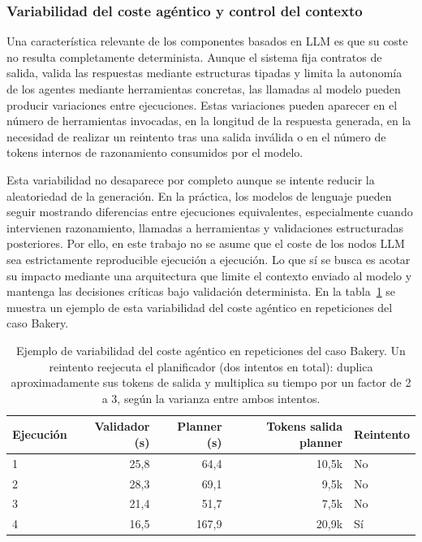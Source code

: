 \documentclass[12pt,a4paper]{article}
\theoremstyle{plain}
\begin{document}
\subsubsection{Variabilidad del coste agéntico y control del contexto}
\label{sec:coste-variabilidad}

Una característica relevante de los componentes basados en LLM es que su coste no resulta
completamente determinista. Aunque el sistema fija contratos de salida, valida las respuestas
mediante estructuras tipadas y limita la autonomía de los agentes mediante herramientas
concretas, las llamadas al modelo pueden producir variaciones entre ejecuciones. Estas
variaciones pueden aparecer en el número de herramientas invocadas, en la longitud de la
respuesta generada, en la necesidad de realizar un reintento tras una salida inválida o en el
número de tokens internos de razonamiento consumidos por el modelo.

Esta variabilidad no desaparece por completo aunque se intente reducir la aleatoriedad de la
generación. En la práctica, los modelos de lenguaje pueden seguir mostrando diferencias entre
ejecuciones equivalentes, especialmente cuando intervienen razonamiento, llamadas a
herramientas y validaciones estructuradas posteriores. Por ello, en este trabajo no se asume
que el coste de los nodos LLM sea estrictamente reproducible ejecución a ejecución. Lo que sí
se busca es acotar su impacto mediante una arquitectura que limite el contexto enviado al
modelo y mantenga las decisiones críticas bajo validación determinista. En la tabla~\ref{tab:variabilidad-coste-agente} se muestra un ejemplo de esta variabilidad del coste agéntico en repeticiones del caso Bakery. %

\begin{table}[H]
\centering
\footnotesize
\setlength{\tabcolsep}{4pt}
\renewcommand{\arraystretch}{1.05}
\begin{tabular}{lrrrl}
\hline
\textbf{Ejecución} & \textbf{Validador (s)} & \textbf{Planner (s)} & \textbf{Tokens salida planner} & \textbf{Reintento} \\\hline
1 & 25,8 & 64,4  & 10,5k & No \\\hline
2 & 28,3 & 69,1  & 9,5k  & No \\\hline
3 & 21,4 & 51,7  & 7,5k  & No \\\hline
4 & 16,5 & 167,9 & 20,9k & Sí \\\hline
\end{tabular}
\caption{Ejemplo de variabilidad del coste agéntico en repeticiones del caso Bakery.
 Un reintento reejecuta el planificador (dos intentos en total): duplica aproximadamente
 sus tokens de salida y multiplica su tiempo por un factor de 2 a 3, según la
 varianza entre ambos intentos.}
\label{tab:variabilidad-coste-agente}
\end{table}
\end{document}
